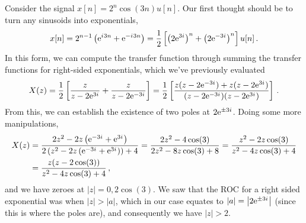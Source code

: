 %
\begin{exmp}
  Consider the signal $x[n] = 2^n\cos(3n)u[n]$. Our first thought should be
  to turn any sinusoids into exponentials,
  \begin{displaymath}
    x[n] = 2^{n-1}\left(\mathrm{e}^{{i\mkern1mu} 3n} + \mathrm{e}^{-{i\mkern1mu} 3n}\right) = \frac{1}{2}\left[
      \left(2\mathrm{e}^{3{i\mkern1mu}}\right)^n + \left(2\mathrm{e}^{-3{i\mkern1mu}}\right)^n 
    \right] u[n] \,.
  \end{displaymath}
  In this form, we can compute the transfer function through summing
  the transfer functions for right-sided exponentials, which we've previously
  evaluated
  \begin{displaymath}
    X(z) = \frac{1}{2}\left[\frac{z}{z - 2\mathrm{e}^{3{i\mkern1mu}}} + \frac{z}{z - 2\mathrm{e}^{-3{i\mkern1mu}}}\right]
    = \frac{1}{2}\left[\frac{z(z-2\mathrm{e}^{-3{i\mkern1mu}}) + z(z - 2\mathrm{e}^{3{i\mkern1mu}})}{(z-2\mathrm{e}^{-3{i\mkern1mu}})(z-2\mathrm{e}^{3{i\mkern1mu}})}\right] \,.
  \end{displaymath}
  From this, we can establish the existence of two poles at $2\mathrm{e}^{\pm3{i\mkern1mu}}$.
  Doing some more manipulations,
  \begin{align*}
    X(z) &= \frac{
      2z^2 - 2z\left(\mathrm{e}^{-3{i\mkern1mu}} + \mathrm{e}^{3{i\mkern1mu}}\right)
    }{
      2\left(z^2 - 2z\left(\mathrm{e}^{-3{i\mkern1mu}} + \mathrm{e}^{3{i\mkern1mu}}\right)\right) + 4
    }
    = \frac{2z^2 - 4\cos(3)}{2z^2 - 8z\cos(3) + 8}
    = \frac{z^2 - 2z\cos(3)}{z^2 - 4z\cos(3) + 4} \\
    &= \frac{z(z - 2\cos(3))}{z^2 - 4z\cos(3) + 4} \,,
  \end{align*}
  and we have zeroes at $|z| = 0, 2\cos(3)$. We saw that the ROC for a right
  sided exponential was when $|z| > |a|$, which in our case equates to
  $|a| = \left|2\mathrm{e}^{\pm 3{i\mkern1mu}}\right|$ (since this is where the poles are),
  and consequently we have $|z| > 2$.
\end{exmp}
%

